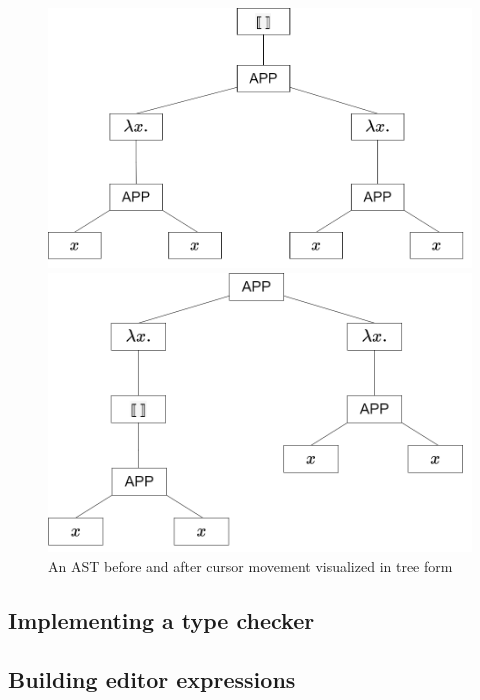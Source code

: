 \begin{figure}
  \center
  \noindent\begin{minipage}{.45\textwidth}
    \center
    \includegraphics[width=\textwidth]{assets/ast_root_cursor.png}
  \end{minipage}\hfill
  \begin{minipage}{.45\textwidth}
    \center
    \includegraphics[width=\textwidth]{assets/ast_subtree_cursor.png}
  \end{minipage}\hfill
  \caption{An AST before and after cursor movement visualized in tree form}
  \label{fig:ast_visual_tree}
\end{figure}

\subsection{Implementing a type checker}

\subsection{Building editor expressions}


